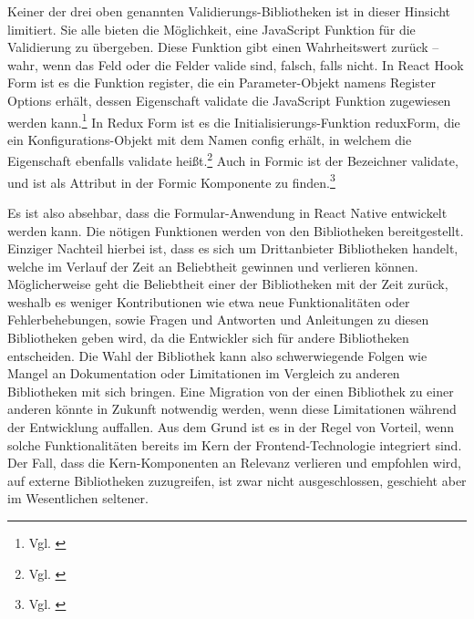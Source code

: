 Keiner der drei oben genannten Validierungs-Bibliotheken ist in dieser Hinsicht limitiert. Sie alle bieten die Möglichkeit, eine JavaScript Funktion für die Validierung zu übergeben. Diese Funktion gibt einen Wahrheitswert zurück – wahr, wenn das Feld oder die Felder valide sind, falsch, falls nicht. In React Hook Form ist es die Funktion register, die ein Parameter-Objekt namens Register Options erhält, dessen Eigenschaft validate die JavaScript Funktion zugewiesen werden kann.\footnote{Vgl. \cite{RegisterReactHookFormAPI}}
In Redux Form ist es die Initialisierungs-Funktion reduxForm, die ein Konfigurations-Objekt mit dem Namen config erhält, in welchem die Eigenschaft ebenfalls validate heißt.\footnote{Vgl. \cite{ReduxFormReduxFormAPI}}
Auch in Formic ist der Bezeichner validate, und ist als Attribut in der Formic Komponente  zu finden.\footnote{Vgl. \cite{FormikComponentFormikDocsAPI}}


Es ist also absehbar, dass die Formular-Anwendung in React Native entwickelt werden kann.
Die nötigen Funktionen werden von den Bibliotheken bereitgestellt.
Einziger Nachteil hierbei ist, dass es sich um Drittanbieter Bibliotheken handelt, welche im Verlauf der Zeit an Beliebtheit gewinnen und verlieren können.
Möglicherweise geht die Beliebtheit einer der Bibliotheken mit der Zeit zurück, weshalb es weniger Kontributionen wie etwa neue Funktionalitäten oder Fehlerbehebungen, sowie Fragen und Antworten und Anleitungen zu diesen Bibliotheken geben wird, da die Entwickler sich für andere Bibliotheken entscheiden.
Die Wahl der Bibliothek kann also schwerwiegende Folgen wie Mangel an Dokumentation oder Limitationen im Vergleich zu anderen Bibliotheken mit sich bringen.
Eine Migration von der einen Bibliothek zu einer anderen könnte in Zukunft notwendig werden, wenn diese Limitationen während der Entwicklung auffallen. Aus dem Grund ist es in der Regel von Vorteil, wenn solche Funktionalitäten bereits im Kern der Frontend-Technologie integriert sind.
Der Fall, dass die Kern-Komponenten an Relevanz verlieren und empfohlen wird, auf externe Bibliotheken zuzugreifen, ist zwar nicht ausgeschlossen, geschieht aber im Wesentlichen seltener.



















